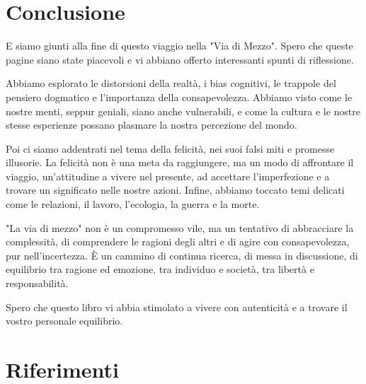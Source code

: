 \documentclass[12pt]{book} %
\begin{document}
\clearpage\section{Conclusione}

E siamo giunti alla fine di questo viaggio nella "Via di Mezzo". Spero che queste pagine siano state piacevoli e vi abbiano offerto interessanti spunti di riflessione.

Abbiamo esplorato le distorsioni della realtà, i bias cognitivi, le trappole del pensiero dogmatico e l'importanza della consapevolezza. Abbiamo visto come le nostre menti, seppur geniali, siano anche vulnerabili, e come la cultura e le nostre stesse esperienze possano plasmare la nostra percezione del mondo.

Poi ci siamo addentrati nel tema della felicità, nei suoi falsi miti e promesse illusorie. La felicità non è una meta da raggiungere, ma un modo di affrontare il viaggio, un'attitudine a vivere nel presente, ad accettare l'imperfezione e a trovare un significato nelle nostre azioni.
Infine, abbiamo toccato temi delicati come le relazioni, il lavoro, l'ecologia, la guerra e la morte.

"La via di mezzo" non è un compromesso vile, ma un tentativo di abbracciare la complessità, di comprendere le ragioni degli altri e di agire con consapevolezza, pur nell'incertezza. È un cammino di continua ricerca, di messa in discussione, di equilibrio tra ragione ed emozione, tra individuo e società, tra libertà e responsabilità.

Spero che questo libro vi abbia stimolato a vivere con autenticità e a trovare il vostro personale equilibrio.

\clearpage\section{Riferimenti}
\theendnotes

\clearpage
{}
\end{document}
